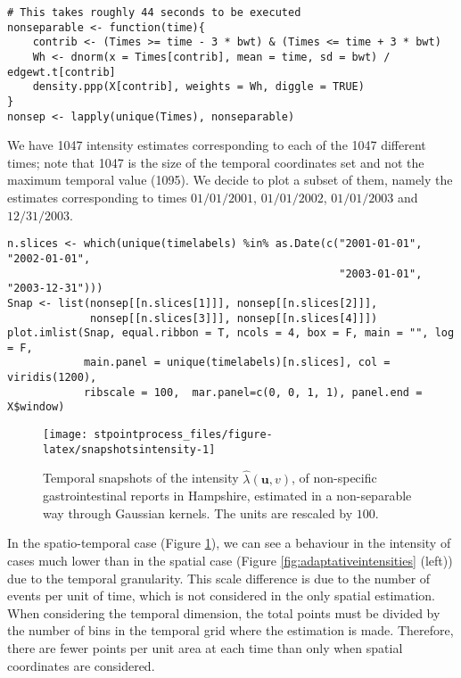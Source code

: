\begin{verbatim}
# This takes roughly 44 seconds to be executed 
nonseparable <- function(time){
    contrib <- (Times >= time - 3 * bwt) & (Times <= time + 3 * bwt)
    Wh <- dnorm(x = Times[contrib], mean = time, sd = bwt) / edgewt.t[contrib]
    density.ppp(X[contrib], weights = Wh, diggle = TRUE)
}
nonsep <- lapply(unique(Times), nonseparable)
\end{verbatim}

We have 1047 intensity estimates corresponding to each of the 1047 different times; note that 1047 is the size of the temporal coordinates set and not the maximum temporal value (1095). We decide to plot a subset of them, namely the estimates corresponding to times \(01/01/2001\), \(01/01/2002\), \(01/01/2003\) and \(12/31/2003\).

\begin{verbatim}
n.slices <- which(unique(timelabels) %in% as.Date(c("2001-01-01", "2002-01-01", 
                                                    "2003-01-01", "2003-12-31")))
Snap <- list(nonsep[[n.slices[1]]], nonsep[[n.slices[2]]], 
             nonsep[[n.slices[3]]], nonsep[[n.slices[4]]])
plot.imlist(Snap, equal.ribbon = T, ncols = 4, box = F, main = "", log = F,
            main.panel = unique(timelabels)[n.slices], col = viridis(1200),
            ribscale = 100,  mar.panel=c(0, 0, 1, 1), panel.end = X$window)
\end{verbatim}

\begin{figure}

{\centering \texttt{[image: stpointprocess\_files/figure-latex/snapshotsintensity-1]} 

}

\caption{Temporal snapshots of the intensity $\hat{\lambda}(\mathbf{u},v)$, of non-specific gastrointestinal reports in Hampshire, estimated in a non-separable way through Gaussian kernels. The units are rescaled by $100$.}\label{fig:snapshotsintensity}
\end{figure}

In the spatio-temporal case (Figure \ref{fig:snapshotsintensity}), we can see a behaviour in the intensity of cases much lower than in the spatial case (Figure \ref{fig:adaptativeintensities} (left)) due to the temporal granularity. This scale difference is due to the number of events per unit of time, which is not considered in the only spatial estimation. When considering the temporal dimension, the total points must be divided by the number of bins in the temporal grid where the estimation is made. Therefore, there are fewer points per unit area at each time than only when spatial coordinates are considered.

